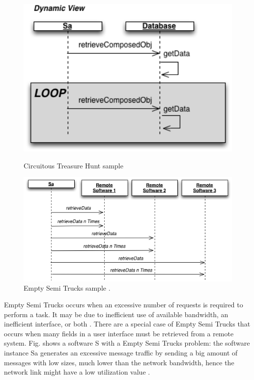 \documentclass{report}
\begin{document}
\begin{figure}[h]
\begin{minipage}{.5\textwidth}
\centering
\includegraphics[width=1\textwidth]{./images/circuit.png}
\caption{Circuitous
Treasure Hunt sample \cite{Vetoio2011}}
\label{fig:circuit}
\end{minipage}
\begin{minipage}{.5\textwidth}
\centering
\includegraphics[width=1\textwidth]{./images/trucks2.png}
\caption{Empty Semi Trucks sample \cite{Vetoio2011}.}
\label{fig:trucks}
\end{minipage}
\end{figure}

Empty Semi Trucks occurs when an excessive number of requests is required to perform a task. It may be due to inefficient use of available bandwidth, an inefficient interface, or both \cite{Arcelli2012}. There are a special case of Empty Semi Trucks that occurs  when many fields in a user interface must be retrieved from a
remote system. Fig. shows a software S with a Empty Semi Trucks problem: the software instance Sa generates an excessive message traffic by sending a big amount of messages with low sizes, much lower than the network bandwidth, hence the network link might have a low utilization value \cite{Vetoio2011}.
\end{document}
